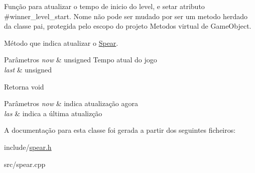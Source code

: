 Função para atualizar o tempo de inicio do level, e setar atributo \#winner\+\_\+level\+\_\+start. Nome não pode ser mudado por ser um metodo herdado da classe pai, protegida pelo escopo do projeto Metodos virtual de Game\+Object. 

Método que indica atualizar o \mbox{\hyperlink{classSpear}{Spear}}.


\begin{DoxyParams}{Parâmetros}
{\em now} & unsigned Tempo atual do jogo \\
\hline
{\em last} & unsigned \\
\hline
\end{DoxyParams}
\begin{DoxyReturn}{Retorna}
void
\end{DoxyReturn}

\begin{DoxyParams}{Parâmetros}
{\em now} & indica atualização agora \\
\hline
{\em las} & indica a última atualizção \\
\hline
\end{DoxyParams}


A documentação para esta classe foi gerada a partir dos seguintes ficheiros\+:\begin{DoxyCompactItemize}
\item 
include/\mbox{\hyperlink{spear_8h}{spear.\+h}}\item 
src/spear.\+cpp\end{DoxyCompactItemize}
